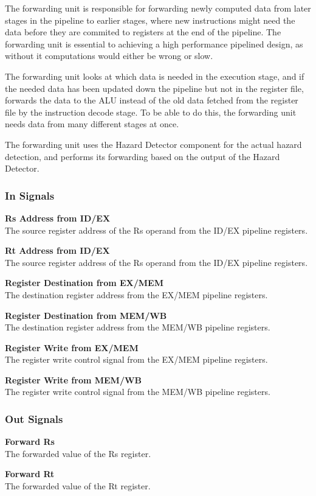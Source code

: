 The forwarding unit is responsible for forwarding newly computed data from later stages in the pipeline to earlier stages, where new instructions might need the data before they are commited to registers at the end of the pipeline.
The forwarding unit is essential to achieving a high performance pipelined design, as without it computations would either be wrong or slow.

The forwarding unit looks at which data is needed in the execution stage, and if the needed data has been updated down the pipeline but not in the register file, forwards the data to the ALU instead of the old data fetched from the register file by the instruction decode stage.
To be able to do this, the forwarding unit needs data from many different stages at once.

The forwarding unit uses the Hazard Detector component for the actual hazard detection, and performs its forwarding based on the output of the Hazard Detector.

\subsubsection{In Signals}

\begin{description}
\item{\textbf{Rs Address from ID/EX }} \\
    The source register address of the Rs operand from the ID/EX pipeline registers.

\item{\textbf{Rt Address from ID/EX}} \\
    The source register address of the Rs operand from the ID/EX pipeline registers.

\item{\textbf{Register Destination from EX/MEM}} \\
    The destination register address from the EX/MEM pipeline registers.

\item{\textbf{Register Destination from MEM/WB}} \\
    The destination register address from the MEM/WB pipeline registers.

\item{\textbf{Register Write from EX/MEM}} \\
    The register write control signal from the EX/MEM pipeline registers.

\item{\textbf{Register Write from MEM/WB}} \\
    The register write control signal from the MEM/WB pipeline registers.
\end{description}

\subsubsection{Out Signals}

\begin{description}
\item{\textbf{Forward Rs}} \\
    The forwarded value of the Rs register.

\item{\textbf{Forward Rt}} \\
    The forwarded value of the Rt register.

\end{description}
